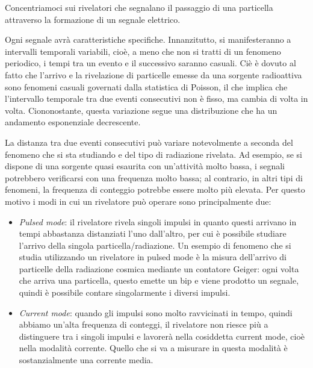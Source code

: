 Concentriamoci sui rivelatori che segnalano il passaggio di una particella attraverso la formazione di un segnale elettrico.

\begin{figure}[H]
   \centering
\end{figure}

Ogni segnale avrà caratteristiche specifiche. Innanzitutto, si manifesteranno a intervalli temporali variabili, cioè, a meno che non si tratti di un fenomeno periodico, i tempi tra un evento e il successivo saranno casuali. Ciè è dovuto al fatto che l'arrivo e la rivelazione di particelle emesse da una sorgente radioattiva sono fenomeni casuali governati dalla statistica di Poisson, il che implica che l'intervallo temporale tra due eventi consecutivi non è fisso, ma cambia di volta in volta. Ciononostante, questa variazione segue una distribuzione che ha un andamento esponenziale decrescente.

La distanza tra due eventi consecutivi può variare notevolmente a seconda del fenomeno che si sta studiando e del tipo di radiazione rivelata. Ad esempio, se si dispone di una sorgente quasi esaurita con un'attività molto bassa, i segnali potrebbero verificarsi con una frequenza molto bassa; al contrario, in altri tipi di fenomeni, la frequenza di conteggio potrebbe essere molto più elevata. Per questo motivo i modi in cui un rivelatore può operare sono principalmente due:

\begin{itemize}[leftmargin=0.5cm]
   \item \textit{Pulsed mode}: il rivelatore rivela singoli impulsi in quanto questi arrivano in tempi abbastanza distanziati l'uno dall'altro, per cui è possibile studiare l'arrivo della singola particella/radiazione. Un esempio di fenomeno che si studia utilizzando un rivelatore in pulsed mode è la misura dell'arrivo di particelle della radiazione cosmica mediante un contatore Geiger: ogni volta che arriva una particella, questo emette un bip e viene prodotto un segnale, quindi è possibile contare singolarmente i diversi impulsi.
   \item \textit{Current mode}: quando gli impulsi sono molto ravvicinati in tempo, quindi abbiamo un'alta frequenza di conteggi, il rivelatore non riesce più a distinguere tra i singoli impulsi e lavorerà nella cosiddetta current mode, cioè nella modalità corrente. Quello che si va a misurare in questa modalità è sostanzialmente una corrente media.
\end{itemize}

